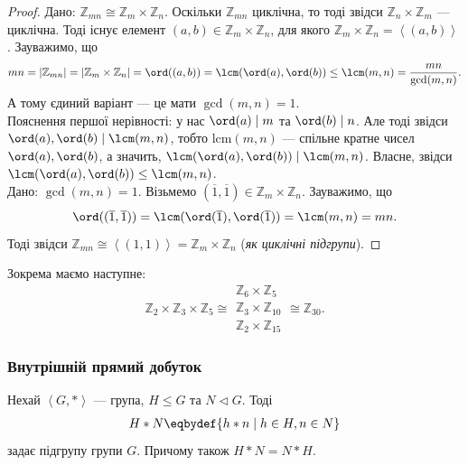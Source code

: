 \documentclass{math_library}
\begin{document}
\begin{proof}
\rightproof Дано: $\mathbb{Z}_{mn} \cong \mathbb{Z}_m \times \mathbb{Z}_n$. Оскільки $\mathbb{Z}_{mn}$ циклічна, то тоді звідси $\mathbb{Z}_n \times \mathbb{Z}_m$ --- циклічна. Тоді існує елемент $(a,b) \in \mathbb{Z}_m \times \mathbb{Z}_n$, для якого $\mathbb{Z}_m \times \mathbb{Z}_n = \left<(a,b)\right>$. Зауважимо, що
\[
mn = |\mathbb{Z}_{mn}| = |\mathbb{Z}_m \times \mathbb{Z}_n| = \ord((a,b)) = \lcm(\ord(a),\ord(b)) \leq \lcm(m,n) = \dfrac{mn}{\gcd(m,n)}.
\]
А тому єдиний варіант --- це мати $\gcd(m,n) = 1$.\\
Пояснення першої нерівності: у нас $\ord(a) \mid m$ та $\ord(b) \mid n$. Але тоді звідси $\ord(a), \ord(b) \mid \lcm(m,n)$, тобто $\text{lcm}(m,n)$ --- спільне кратне чисел $\ord(a),\ord(b)$, а значить, $\lcm(\ord(a),\ord(b)) \mid \lcm(m,n)$. Власне, звідси $\lcm(\ord(a),\ord(b)) \leq \lcm(m,n)$.
\bigskip \\
\leftproof Дано: $\gcd(m,n) = 1$. Візьмемо $(\overline{1},\overline{1}) \in \mathbb{Z}_m \times \mathbb{Z}_n$. Зауважимо, що \[
\ord((\overline{1},\overline{1})) = \lcm(\ord(\overline{1}),\ord(\overline{1})) = \lcm(m,n) = mn.
\]
Тоді звідси $\mathbb{Z}_{mn} \cong \left<(1,1)\right> = \mathbb{Z}_m \times \mathbb{Z}_n $ (\textit{як циклічні підгрупи}).
\end{proof}

\begin{example}
Зокрема маємо наступне:
\[
\mathbb{Z}_{2} \times \mathbb{Z}_3 \times \mathbb{Z}_5 \cong \begin{gathered} \mathbb{Z}_6 \times \mathbb{Z}_5 \\ \mathbb{Z}_3 \times \mathbb{Z}_{10} \\ \mathbb{Z}_{2} \times \mathbb{Z}_{15} \end{gathered} \cong \mathbb{Z}_{30}.
\]
\end{example}

\subsubsection{Внутрішній прямий добуток}
\begin{proposition}
Нехай $\left<G,*\right>$ --- група, $H \leq G$ та $N \triangleleft G$. Тоді
\begin{align*}
H*N \eqbydef \{ h*n \mid h \in H, n \in N \}
\end{align*}
задає підгрупу групи $G$. Причому також $H*N = N*H$.
\end{proposition}
\end{document}
